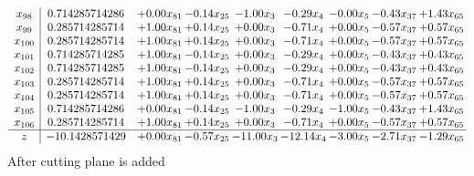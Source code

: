 \documentclass[8pt]{article}
\begin{document}
\[\begin{array}{c| c c@{\hskip 2pt} c@{\hskip 2pt} c@{\hskip 2pt} c@{\hskip 2pt} c@{\hskip 2pt} c@{\hskip 2pt} c@{\hskip 2pt} }
 x_{98}   &  0.714285714286 & +  0.00 x_{81} & -0.14 x_{25} & -1.00 x_{3} & -0.29 x_{4} & -0.00 x_{5} & -0.43 x_{37} & +  1.43 x_{65}\\
 x_{99}   &  0.285714285714 & +  1.00 x_{81} & +  0.14 x_{25} & +  0.00 x_{3} & -0.71 x_{4} & +  0.00 x_{5} & -0.57 x_{37} & +  0.57 x_{65}\\
 x_{100}   &  0.285714285714 & +  1.00 x_{81} & +  0.14 x_{25} & +  0.00 x_{3} & -0.71 x_{4} & +  0.00 x_{5} & -0.57 x_{37} & +  0.57 x_{65}\\
 x_{101}   &  0.714285714285 & +  1.00 x_{81} & -0.14 x_{25} & +  0.00 x_{3} & -0.29 x_{4} & +  0.00 x_{5} & -0.43 x_{37} & +  0.43 x_{65}\\
 x_{102}   &  0.714285714285 & +  1.00 x_{81} & -0.14 x_{25} & +  0.00 x_{3} & -0.29 x_{4} & +  0.00 x_{5} & -0.43 x_{37} & +  0.43 x_{65}\\
 x_{103}   &  0.285714285714 & +  1.00 x_{81} & +  0.14 x_{25} & +  0.00 x_{3} & -0.71 x_{4} & +  0.00 x_{5} & -0.57 x_{37} & +  0.57 x_{65}\\
 x_{104}   &  0.285714285714 & +  1.00 x_{81} & +  0.14 x_{25} & +  0.00 x_{3} & -0.71 x_{4} & +  0.00 x_{5} & -0.57 x_{37} & +  0.57 x_{65}\\
 x_{105}   &  0.714285714286 & +  0.00 x_{81} & -0.14 x_{25} & -1.00 x_{3} & -0.29 x_{4} & -1.00 x_{5} & -0.43 x_{37} & +  1.43 x_{65}\\
 x_{106}   &  0.285714285714 & +  1.00 x_{81} & +  0.14 x_{25} & +  0.00 x_{3} & -0.71 x_{4} & +  0.00 x_{5} & -0.57 x_{37} & +  0.57 x_{65}\\
\hline
z    &  -10.1428571429 & +  0.00 x_{81} & -0.57 x_{25} & -11.00 x_{3} & -12.14 x_{4} & -3.00 x_{5} & -2.71 x_{37} & -1.29 x_{65}\\
\end{array}\]
 After cutting plane is added 
\end{document}
